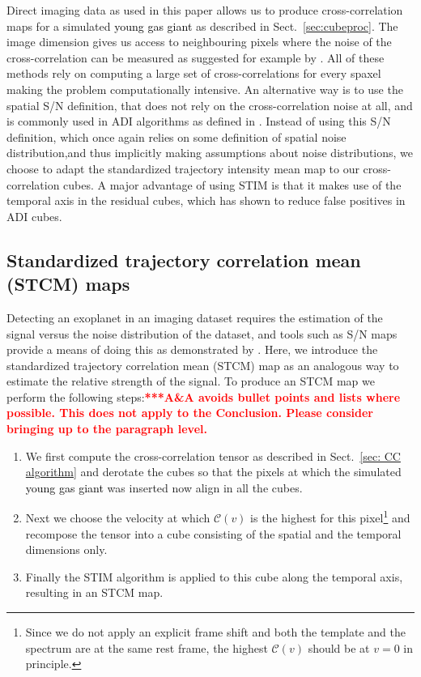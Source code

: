 \documentclass{aa}
\newcommand{\newchange}[1]{\textcolor{black}{#1}}
\begin{document}
Direct imaging data as used in this paper allows us to produce cross-correlation maps for a simulated \newchange{young gas giant} as described in Sect.~\ref{sec:cubeproc}.
The image dimension gives us access to neighbouring pixels where the noise of the cross-correlation can be measured as suggested for example by \citet{2022Patapis}.
All of these methods rely on computing a large set of cross-correlations for every spaxel making the problem computationally intensive.
An alternative way is to use the spatial S/N definition, that does not rely on the cross-correlation noise at all, and is commonly used in ADI algorithms as defined in \citet{2014MawetSNR}.
Instead of using this S/N definition, which once again relies on some definition of spatial noise distribution,and thus implicitly making assumptions about noise distributions,  we choose to adapt the standardized trajectory intensity mean \citep[STIM,][]{2019Pairet} map to our cross-correlation cubes. 
A major advantage of using STIM is that it makes use of the temporal axis in the residual cubes, which has shown to reduce false positives in ADI cubes.
\subsection{Standardized trajectory correlation mean (STCM) maps}

Detecting an exoplanet in an imaging dataset requires the estimation of the signal versus the noise distribution of the dataset, and tools such as S/N maps provide a means of doing this as demonstrated by \citet{2014MawetSNR}.
Here, we introduce the standardized trajectory correlation mean (STCM) map as an analogous way to estimate the relative strength of the signal. To produce an STCM map we perform the following steps:\textcolor{red}{\textbf{***A\&A avoids bullet points and lists where possible. This does not apply to the Conclusion. Please consider bringing up to the paragraph level. }}
\begin{enumerate}
    \item We first compute the cross-correlation tensor as described in Sect.~\ref{sec: CC algorithm} and derotate the cubes so that the pixels at which the simulated \newchange{young gas giant} was inserted now align in all the cubes.
    \item Next we choose the velocity at which $\mathcal{C}(v)$ is the highest for this pixel\footnote{Since we do not apply an explicit frame shift and both the template and the spectrum are at the same rest frame, the highest $\mathcal{C}(v)$ should be at $v=0$ in principle.} and recompose the tensor into a cube consisting of the spatial and the temporal dimensions only.
    \item Finally the STIM algorithm is applied to this cube along the temporal axis, resulting in an STCM map.
\end{enumerate}
\end{document}

